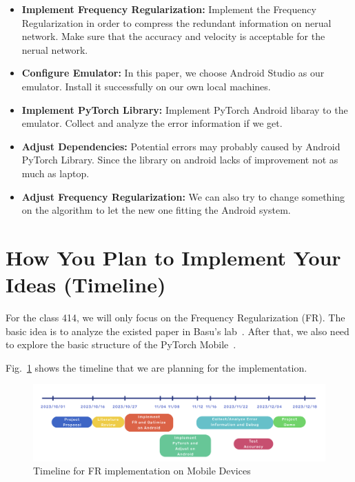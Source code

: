 \documentclass{article}
\begin{document}
\begin{itemize}
	\item \textbf{Implement Frequency Regularization:} Implement the Frequency Regularization in order to compress the redundant information on nerual network. Make sure that the accuracy and velocity is acceptable for the nerual network.
	
	\item \textbf{Configure Emulator:} In this paper, we choose Android Studio as our emulator. Install it successfully on our own local machines.
	
	\item \textbf{Implement PyTorch Library:} Implement PyTorch Android libaray to the emulator. Collect and analyze the error information if we get.
	
	\item \textbf{Adjust Dependencies:} Potential errors may probably caused by Android PyTorch Library. Since the library on android lacks of improvement not as much as laptop.
	
	\item \textbf{Adjust Frequency Regularization:} We can also try to change something on the algorithm to let the new one fitting the Android system.
	
\end{itemize}

\section{How You Plan to Implement Your Ideas (Timeline)}

For the class 414, we will only focus on the Frequency Regularization (FR). The basic idea is to analyze the existed paper in Basu's lab~\cite{zhao2023frequency}. After that, we also need to explore the basic structure of the PyTorch Mobile~\cite{pytorch_mobile}.

Fig.~\ref{timeline_fig} shows the timeline that we are planning for the implementation. 
\begin{figure}[!h]
\centering
\includegraphics[width=1\textwidth]{./figure/timeline.png}
\caption{Timeline for FR implementation on Mobile Devices}
 \label{timeline_fig}
\end{figure}
\end{document}
